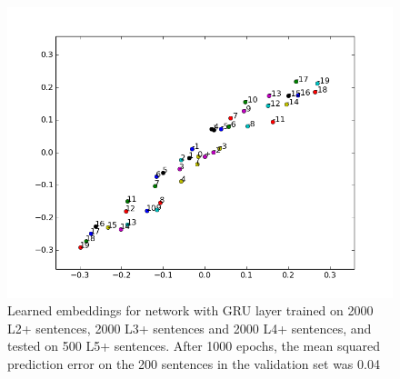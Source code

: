 \documentclass{article}
\begin{document}
\begin{figure}[!ht]
        \includegraphics[scale=0.8]{GRU_L2L3L4.png}
        \caption{Learned embeddings for network with GRU layer trained on 2000 L2+ sentences, 2000 L3+ sentences and 2000 L4+ sentences, and tested on 500 L5+ sentences. After 1000 epochs, the mean squared prediction error on the 200 sentences in the validation set was 0.04}\label{fig:GRU_L2L3L4}
\end{figure}
\end{document}
